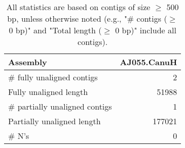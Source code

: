 \documentclass[12pt,a4paper]{article}
\begin{document}
\begin{table}[ht]
\begin{center}
\caption{All statistics are based on contigs of size $\geq$ 500 bp, unless otherwise noted (e.g., "\# contigs ($\geq$ 0 bp)" and "Total length ($\geq$ 0 bp)" include all contigs).}
\begin{tabular}{|l*{1}{|r}|}
\hline
Assembly & AJ055.CanuH \\ \hline
\# fully unaligned contigs & 2 \\ \hline
Fully unaligned length & 51988 \\ \hline
\# partially unaligned contigs & 1 \\ \hline
Partially unaligned length & 177021 \\ \hline
\# N's & 0 \\ \hline
\end{tabular}
\end{center}
\end{table}
\end{document}
